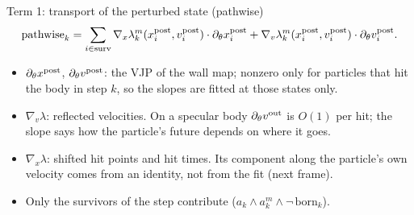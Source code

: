 \begin{frame}{Term 1: transport of the perturbed state (pathwise)}
\[
\text{pathwise}_k = \sum_{i\in\text{surv}}
\nabla_x\lambda^m_k(x^{\mathrm{post}}_i, v^{\mathrm{post}}_i)\cdot\partial_\theta x^{\mathrm{post}}_i
+ \nabla_v\lambda^m_k(x^{\mathrm{post}}_i, v^{\mathrm{post}}_i)\cdot\partial_\theta v^{\mathrm{post}}_i .
\]
\begin{itemize}
\item $\partial_\theta x^{\mathrm{post}}$, $\partial_\theta v^{\mathrm{post}}$: the VJP of the wall map; nonzero only
  for particles that hit the body in step $k$, so the slopes are fitted at those states only.
\item $\nabla_v\lambda$: reflected velocities.  On a specular body $\partial_\theta v^{\mathrm{out}}$ is
  $O(1)$ per hit; the slope says how the particle's future depends on where it goes.
\item $\nabla_x\lambda$: shifted hit points and hit times.  Its component along the
  particle's own velocity comes from an identity, not from the fit (next frame).
\item Only the survivors of the step contribute
  ($a_k\wedge a^m_k\wedge\neg\,\mathrm{born}_k$).
\end{itemize}
\end{frame}

